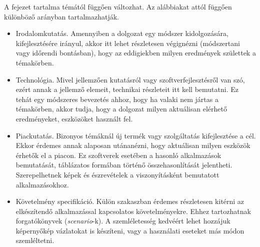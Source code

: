 A fejezet tartalma témától függően változhat. Az alábbiakat attól függően különböző arányban tartalmazhatják.
\begin{itemize}
\item Irodalomkutatás. Amennyiben a dolgozat egy módszer kidolgozására, kifejlesztésére irányul, akkor itt lehet részletesen végignézni (módszertani vagy időrendi bontásban), hogy az eddigiekben milyen eredmények születtek a témakörben.
\item Technológia. Mivel jellemzően kutatásról vagy szoftverfejlesztésről van szó, ezért annak a jellemző elemeit, technikai részleteit itt kell bemutatni.
Ez tehát egy módszeres bevezetés ahhoz, hogy ha valaki nem jártas a témakörben, akkor tudja, hogy a dolgozat milyen aktuálisan elérhető eredményeket, eszközöket használt fel.
\item Piackutatás. Bizonyos témáknál új termék vagy szolgáltatás kifejlesztése a cél.
Ekkor érdemes annak alaposan utánanézni, hogy aktuálisan milyen eszközök érhetők el a piacon.
Ez szoftverek esetében a hasonló alkalmazások bemutatását, táblázatos formában történő összehasonlítását jelentheti.
Szerepelhetnek képek és észrevételek a viszonyításként bemutatott alkalmazásokhoz.
\item Követelmény specifikáció. Külön szakaszban érdemes részletesen kitérni az elkészítendő alkalmazással kapcsolatos követelményekre.
Ehhez tartozhatnak forgatókönyvek (\textit{scenario}-k).
A szemléletesség kedvéért lehet hozzájuk képernyőkép vázlatokat is készíteni, vagy a használati eseteket más módon szemléltetni.
\end{itemize}
